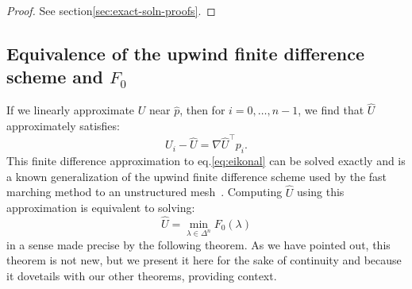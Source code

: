 \documentclass[smallcondensed]{svjour3}
\begin{document}
\begin{proof}
  See section\@ \ref{sec:exact-soln-proofs}.
\end{proof}

\subsection{Equivalence of the upwind finite difference scheme and
  $F_0$}\label{ssec:equivalence}

If we linearly approximate $U$ near $\hat{p}$, then for
$i = 0, \hdots, n - 1$, we find that $\hat{U}$ approximately
satisfies:
\begin{equation}
  \label{eq:finite-differences}
  U_i - \hat{U} = \nabla \hat{U}^\top p_i.
\end{equation}
This finite difference approximation to eq.\@ \ref{eq:eikonal} can
be solved exactly and is a known generalization of the upwind finite
difference scheme used by the fast marching method to an unstructured
mesh~\cite{kimmel1998computing,sethian2000fast}. Computing $\hat{U}$
using this approximation is equivalent to solving:
\begin{equation}
  \hat{U} = \min_{\lambda \in \Delta^n} F_0(\lambda)
\end{equation}
in a sense made precise by the following theorem. As we have pointed
out, this theorem is not new, but we present it here for the sake of
continuity and because it dovetails with our other theorems, providing
context.
\end{document}
